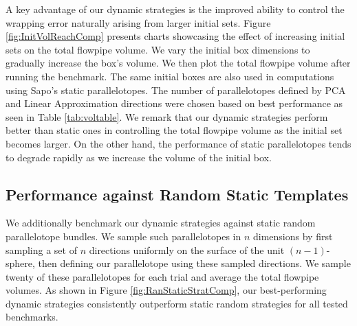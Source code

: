 A key advantage of our dynamic strategies is the improved ability to control the wrapping error naturally arising from larger initial sets. Figure \ref{fig:InitVolReachComp} presents charts showcasing the effect of increasing initial sets on the total flowpipe volume. We vary the initial box dimensions to gradually increase the box's volume. We then plot the total flowpipe volume after running the benchmark. The same initial boxes are also used in computations using Sapo's static parallelotopes. The number of parallelotopes defined by PCA and Linear Approximation directions were chosen based on best performance as seen in Table \ref{tab:voltable}. We remark that our dynamic strategies perform better than static ones in controlling the total flowpipe volume as the initial set becomes larger. On the other hand, the performance of static parallelotopes tends to degrade rapidly as we increase the volume of the initial box.




\subsection{Performance against Random Static Templates}
\label{sec:random_static}

We additionally benchmark our dynamic strategies against static random parallelotope bundles. We sample such parallelotopes in $n$ dimensions by first sampling a set of $n$ directions uniformly on the surface of the unit $(n-1)$-sphere, then defining our parallelotope using these sampled directions. We sample twenty of these parallelotopes for each trial and average the total flowpipe volumes. As shown in Figure \ref{fig:RanStaticStratComp}, our best-performing dynamic strategies consistently outperform static random strategies for all tested benchmarks.


